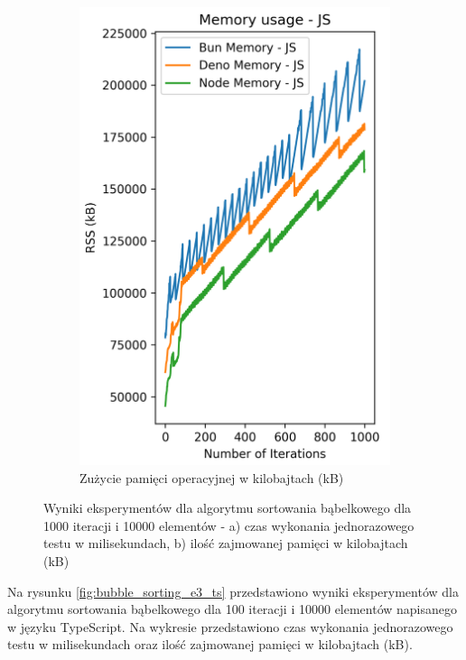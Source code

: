 \begin{figure}[H]
\begin{subfigure}[b]{0.4\textwidth}
    \includegraphics[width=\textwidth]{Figures/sorting/sorting_bubble_1000_10000_js_memory.png}
    \caption{Zużycie pamięci operacyjnej w kilobajtach (kB)}
    \label{fig:bubble_sorting_e3_memory}
  \end{subfigure}
  \caption{Wyniki eksperymentów dla algorytmu sortowania bąbelkowego dla 1000 iteracji i 10000 elementów - a) czas wykonania jednorazowego testu w milisekundach, b) ilość zajmowanej pamięci w kilobajtach (kB)}
  \label{fig:bubble_sorting_e3}
\end{figure}

Na rysunku \ref{fig:bubble_sorting_e3_ts} przedstawiono wyniki eksperymentów dla algorytmu sortowania bąbelkowego dla 100 iteracji i 10000 elementów napisanego w języku TypeScript. Na wykresie przedstawiono czas wykonania jednorazowego testu w milisekundach oraz ilość zajmowanej pamięci w kilobajtach (kB).

